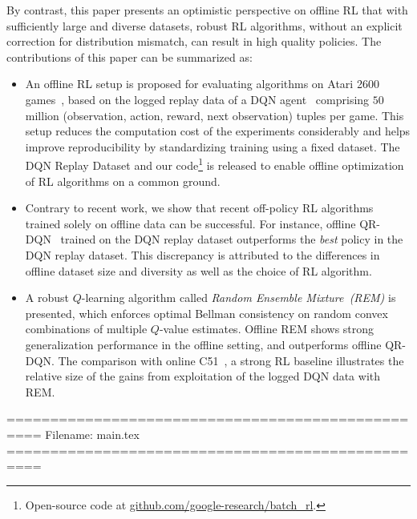By contrast, this paper presents an optimistic perspective on offline
RL that with sufficiently large and diverse datasets, robust RL
algorithms, without an explicit correction for distribution mismatch,
can result in high quality policies.
The contributions of this paper can be summarized as:
\begin{itemize}[topsep=0pt, partopsep=0pt, leftmargin=13pt, parsep=0pt, itemsep=4pt]
\item An offline RL setup is proposed for evaluating algorithms on Atari 2600 games~\citep{bellemare2013arcade}, based
on the logged replay data of a DQN agent~\citep{mnih2015human} comprising $50$ million %
(observation, action, reward, next observation) tuples per game.
This setup reduces the computation cost of the experiments considerably and helps improve reproducibility %
by standardizing training using a fixed dataset. The DQN Replay Dataset and our code\footnote{Open-source code at \href{https://github.com/google-research/batch_rl}{ github.com/google-research/batch\_rl}.} is released to enable
offline optimization of RL algorithms on a common ground.
\item Contrary to recent work, we show that recent off-policy RL algorithms trained solely on offline data can be successful.
For instance, offline QR-DQN~\citep{dabney2018distributional} trained on the DQN replay dataset outperforms the \textit{best} policy in the DQN replay dataset. This discrepancy is attributed to the differences in offline dataset size and diversity as well as the choice of RL algorithm.
\item A robust $Q$-learning algorithm called {\em Random Ensemble
Mixture~(REM)} is presented, which enforces optimal Bellman
consistency on random convex combinations of multiple $Q$-value
estimates. Offline REM shows strong generalization performance in the offline setting,
and outperforms offline QR-DQN. The comparison with
online C51~\citep{bellemare2017distributional}, a strong RL baseline illustrates the
relative size of the gains from exploitation of the logged DQN data with REM.


\end{itemize}



==================================================
Filename: main.tex
==================================================

\documentclass{article}
\usepackage[accepted]{icml2020}

